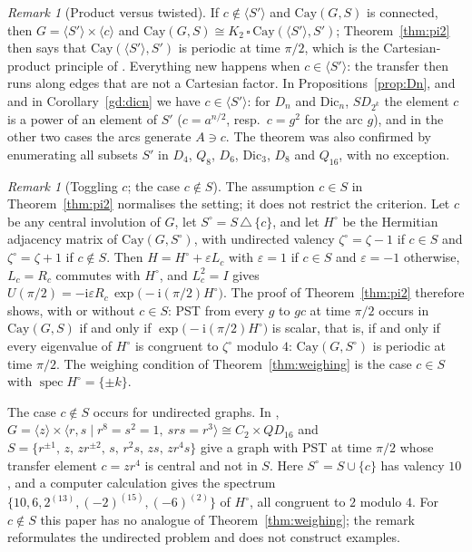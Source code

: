 \documentclass[preprint,11pt]{elsarticle}
\makeatletter
\theoremstyle{definition}
\theoremstyle{remark}
\newtheorem{remark}[theorem]{Remark}
\newcommand{\ii}{\mathrm i}
\newcommand{\SR}[1]{\@nameuse{SR@#1}}
\makeatother
\begin{document}
\begin{remark}[Product versus twisted]\label{rem:twisted}
If $c\notin\langle S'\rangle$ and $\mathrm{Cay}(G,S)$ is connected, then $G=\langle S'\rangle\times\langle c\rangle$ and $\mathrm{Cay}(G,S)\cong K_2\,\square\,\mathrm{Cay}(\langle S'\rangle,S')$; Theorem~\ref{thm:pi2} then says that $\mathrm{Cay}(\langle S'\rangle,S')$ is periodic at time $\pi/2$, which is the Cartesian-product principle of \cite{CG}. Everything new happens when $c\in\langle S'\rangle$: the transfer then runs along edges that are not a Cartesian factor. In Propositions~\ref{prop:Dn}, \SR{prop:dic} and~\SR{prop:k4fam} and in Corollary~\ref{gd:dicn} we have $c\in\langle S'\rangle$: for $D_n$ and $\mathrm{Dic}_n$, $SD_{2^k}$ the element $c$ is a power of an element of $S'$ ($c=a^{n/2}$, resp.\ $c=g^2$ for the arc $g$), and in the other two cases the arcs generate $A\ni c$. The theorem was also confirmed by enumerating all subsets $S'$ in $D_4$, $Q_8$, $D_6$, $\mathrm{Dic}_3$, $D_8$ and $Q_{16}$, with no exception.
\end{remark}

\begin{remark}[Toggling $c$; the case $c\notin S$]\label{rem:toggle}
The assumption $c\in S$ in Theorem~\ref{thm:pi2} normalises the setting; it does not restrict the criterion. Let $c$ be any central involution of $G$, let $S^\circ=S\,\triangle\,\{c\}$, and let $H^\circ$ be the Hermitian adjacency matrix of $\mathrm{Cay}(G,S^\circ)$, with undirected valency $\zeta^\circ=\zeta-1$ if $c\in S$ and $\zeta^\circ=\zeta+1$ if $c\notin S$. Then $H=H^\circ+\varepsilon L_c$ with $\varepsilon=1$ if $c\in S$ and $\varepsilon=-1$ otherwise, $L_c=R_c$ commutes with $H^\circ$, and $L_c^2=I$ gives $U(\pi/2)=-\ii\varepsilon R_c\,\exp\bigl(-\ii(\pi/2)H^\circ\bigr)$. The proof of Theorem~\ref{thm:pi2} therefore shows, with or without $c\in S$: PST from every $g$ to $gc$ at time $\pi/2$ occurs in $\mathrm{Cay}(G,S)$ if and only if $\exp\bigl(-\ii(\pi/2)H^\circ\bigr)$ is scalar, that is, if and only if every eigenvalue of $H^\circ$ is congruent to $\zeta^\circ$ modulo $4$: $\mathrm{Cay}(G,S^\circ)$ is periodic at time $\pi/2$. The weighing condition of Theorem~\ref{thm:weighing} is the case $c\in S$ with $\operatorname{spec}H^\circ=\{\pm k\}$.

The case $c\notin S$ occurs for undirected graphs. In \cite[Section~6.1]{AG}, $G=\langle z\rangle\times\langle r,s\mid r^8=s^2=1,\ srs=r^3\rangle\cong C_2\times QD_{16}$ and $S=\{r^{\pm1},\,z,\,zr^{\pm2},\,s,\,r^2s,\,zs,\,zr^4s\}$ give a graph with PST at time $\pi/2$ whose transfer element $c=zr^4$ is central and not in $S$. Here $S^\circ=S\cup\{c\}$ has valency $10$, and a computer calculation gives the spectrum $\{10,6,2^{(13)},(-2)^{(15)},(-6)^{(2)}\}$ of $H^\circ$, all congruent to $2$ modulo $4$. For $c\notin S$ this paper has no analogue of Theorem~\ref{thm:weighing}; the remark reformulates the undirected problem and does not construct examples.
\end{remark}
\end{document}
